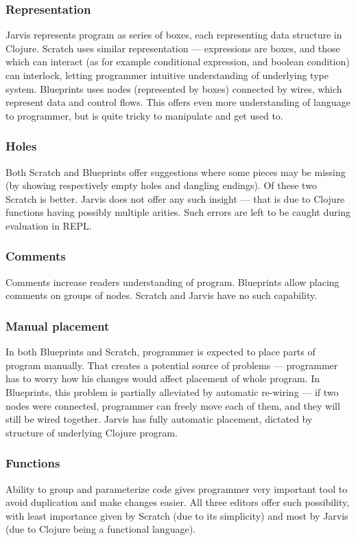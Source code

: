 \documentclass[11pt]{scrartcl}
\begin{document}
\subsubsection*{Representation}
Jarvis represents program as series of boxes, each representing data structure
in Clojure. Scratch uses similar representation --- expressions are boxes, and
those which can interact (as for example conditional expression, and boolean
condition) can interlock, letting programmer intuitive understanding of
underlying type system. Blueprints uses nodes (represented by boxes) connected
by wires, which represent data and control flows. This offers even more
understanding of language to programmer, but is quite tricky to manipulate and
get used to.

\subsubsection*{Holes}
Both Scratch and Blueprints offer suggestions where some pieces may be missing
(by showing respectively empty holes and dangling endings). Of these two Scratch
is better. Jarvis does not offer any such insight --- that is due to Clojure
functions having possibly multiple arities. Such errors are left to be caught
during evaluation in REPL.\@

\subsubsection*{Comments}
Comments increase readers understanding of program. Blueprints allow placing
comments on groups of nodes. Scratch and Jarvis have no such capability.

\subsubsection*{Manual placement}
In both Blueprints and Scratch, programmer is expected to place parts of
program manually. That creates a potential source of problems --- programmer has
to worry how his changes would affect placement of whole program. In Blueprints,
this problem is partially alleviated by automatic re-wiring --- if two nodes
were connected, programmer can freely move each of them, and they will still be
wired together. Jarvis has fully automatic placement, dictated by structure of
underlying Clojure program. 

\subsubsection*{Functions}
Ability to group and parameterize code gives programmer very important tool to
avoid duplication and make changes easier. All three editors offer such
possibility, with least importance given by Scratch (due to its simplicity) and
most by Jarvis (due to Clojure being a functional language).
\end{document}
